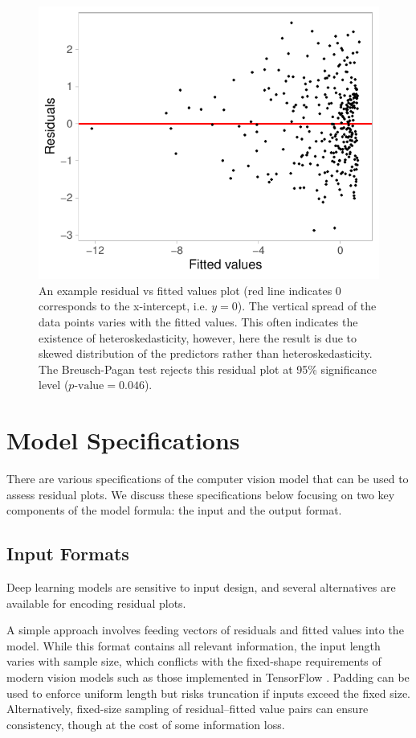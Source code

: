 \documentclass[]{interact}
\theoremstyle{plain}%
\theoremstyle{definition}
\theoremstyle{remark}
\begin{document}
\begin{figure}[!h]

{\centering \includegraphics[width=0.5\linewidth]{paper_files/figure-latex/false-finding-1} 

}

\caption{An example residual vs fitted values plot (red line indicates 0 corresponds to the x-intercept, i.e. $y=0$). The vertical spread of the data points varies with the fitted values. This often indicates the existence of heteroskedasticity, however, here the result is due to skewed distribution of the predictors rather than heteroskedasticity. The Breusch-Pagan test rejects this residual plot at 95\% significance level ($p\text{-value} = 0.046$).}\label{fig:false-finding}
\end{figure}

\section{Model Specifications}\label{sec-model-specifications}

There are various specifications of the computer vision model that can
be used to assess residual plots. We discuss these specifications below
focusing on two key components of the model formula: the input and the
output format.

\subsection{Input Formats}\label{input-formats}

Deep learning models are sensitive to input design, and several
alternatives are available for encoding residual plots.

A simple approach involves feeding vectors of residuals and fitted
values into the model. While this format contains all relevant
information, the input length varies with sample size, which conflicts
with the fixed-shape requirements of modern vision models such as those
implemented in TensorFlow \citep{abadi2016tensorflow}. Padding can be
used to enforce uniform length but risks truncation if inputs exceed the
fixed size. Alternatively, fixed-size sampling of residual--fitted value
pairs can ensure consistency, though at the cost of some information
loss.
\end{document}
